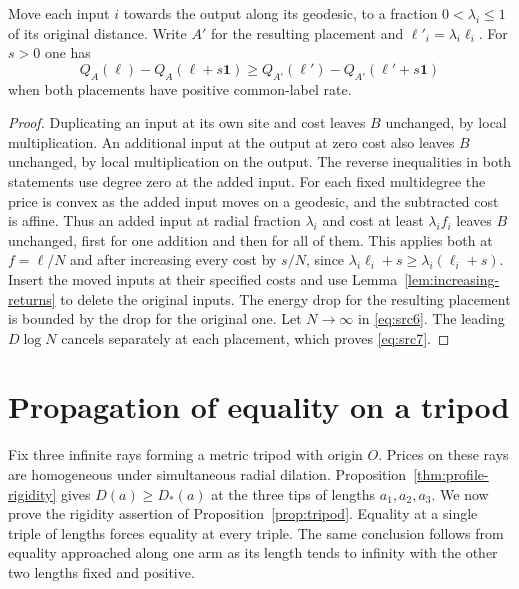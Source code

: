 \begin{lemma}\label{lem:energy-compare}
Move each input $i$ towards the output along its geodesic, to a fraction
$0<\lambda_i\le1$ of its original distance. Write $A'$ for the resulting
placement and $\ell'_i=\lambda_i\ell_i$. For $s>0$ one has
\begin{equation}\label{eq:src7}
 Q_A(\ell)-Q_A(\ell+s\mathbf1)\ge
 Q_{A'}(\ell')-Q_{A'}(\ell'+s\mathbf1)
\end{equation}
when both placements have positive common-label rate.
\end{lemma}

\begin{proof}
Duplicating an input at its own site and cost leaves $B$ unchanged, by
local multiplication. An additional input at the output at zero cost
also leaves $B$ unchanged, by local multiplication on the output.
The reverse inequalities in both statements use degree zero at the
added input. For each fixed multidegree the price is convex as the
added input moves on a geodesic, and the subtracted cost is affine.
Thus an added input at radial fraction $\lambda_i$ and cost at least
$\lambda_i f_i$ leaves $B$ unchanged, first for one addition and then
for all of them. This applies both at $f=\ell/N$ and after increasing
every cost by $s/N$, since $\lambda_i\ell_i+s\ge
\lambda_i(\ell_i+s)$. Insert the moved inputs at their specified costs
and use Lemma~\ref{lem:increasing-returns} to delete the original
inputs. The energy drop for the resulting placement is bounded by the
drop for the original one. Let $N\to\infty$ in \eqref{eq:src6}. The
leading $D\log N$ cancels separately at each placement, which proves
\eqref{eq:src7}.
\end{proof}

\section{Propagation of equality on a tripod}\label{sec:contact}

Fix three infinite rays forming a metric tripod with origin $O$.
Prices on these rays are homogeneous under simultaneous radial
dilation. Proposition~\ref{thm:profile-rigidity} gives
$D(a)\ge D_*(a)$ at the three tips of lengths $a_1,a_2,a_3$.
We now prove the rigidity assertion of Proposition~\ref{prop:tripod}.
Equality at a single triple of lengths forces equality at every
triple. The same conclusion follows from equality approached along
one arm as its length tends to infinity with the other two lengths
fixed and positive.

